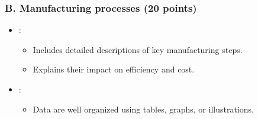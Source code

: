 \documentclass[letterpaper,10pt,english]{jupyterBook}
\begin{document}
\subsubsection{B. Manufacturing processes (20 points)}
\label{\detokenize{ProjectSyllabus:b-manufacturing-processes-20-points}}\begin{itemize}
\item {} 
\sphinxAtStartPar
{}:
\begin{itemize}
\item {} 
\sphinxAtStartPar
Includes detailed descriptions of key manufacturing steps.

\item {} 
\sphinxAtStartPar
Explains their impact on efficiency and cost.

\end{itemize}

\item {} 
\sphinxAtStartPar
{}:
\begin{itemize}
\item {} 
\sphinxAtStartPar
Data are well organized using tables, graphs, or illustrations.

\end{itemize}

\end{itemize}
\end{document}
